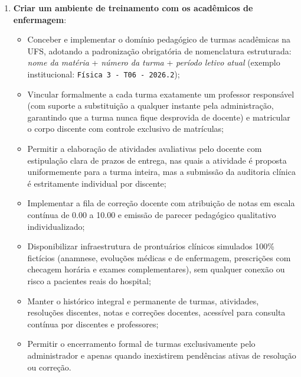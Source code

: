 \begin{enumerate}
    \item \textbf{Criar um ambiente de treinamento com os acadêmicos de enfermagem}:
    \begin{itemize}
        \item Conceber e implementar o domínio pedagógico de turmas acadêmicas na UFS, adotando a padronização obrigatória de nomenclatura estruturada: \textit{nome da matéria} + \textit{número da turma} + \textit{período letivo atual} (exemplo institucional: \texttt{Física 3 - T06 - 2026.2});
        \item Vincular formalmente a cada turma exatamente um professor responsável (com suporte a substituição a qualquer instante pela administração, garantindo que a turma nunca fique desprovida de docente) e matricular o corpo discente com controle exclusivo de matrículas;
        \item Permitir a elaboração de atividades avaliativas pelo docente com estipulação clara de prazos de entrega, nas quais a atividade é proposta uniformemente para a turma inteira, mas a submissão da auditoria clínica é estritamente individual por discente;
        \item Implementar a fila de correção docente com atribuição de notas em escala contínua de 0.00 a 10.00 e emissão de parecer pedagógico qualitativo individualizado;
        \item Disponibilizar infraestrutura de prontuários clínicos simulados 100\% fictícios (anamnese, evoluções médicas e de enfermagem, prescrições com checagem horária e exames complementares), sem qualquer conexão ou risco a pacientes reais do hospital;
        \item Manter o histórico integral e permanente de turmas, atividades, resoluções discentes, notas e correções docentes, acessível para consulta contínua por discentes e professores;
        \item Permitir o encerramento formal de turmas exclusivamente pelo administrador e apenas quando inexistirem pendências ativas de resolução ou correção.
    \end{itemize}


\end{enumerate}
